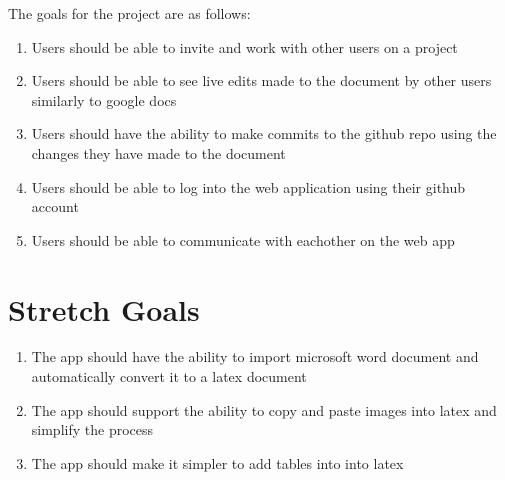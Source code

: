 \documentclass{article}
\begin{document}
The goals for the project are as follows:

\begin{enumerate}
	\item Users should be able to invite and work with other users on a project
	\item Users should be able to see live edits made to the document by other users similarly to google docs
	\item Users should have the ability to make commits to the github repo using the changes they have made to the document
	\item Users should be able to log into the web application using their github account
	\item Users should be able to communicate with eachother on the web app
\end{enumerate}

\section{Stretch Goals}

\begin{enumerate}
	\item The app should have the ability to import microsoft word document and automatically convert it to a latex document
	\item The app should support the ability to copy and paste images into latex and simplify the process
	\item The app should make it simpler to add tables into into latex
\end{enumerate}
\end{document}
